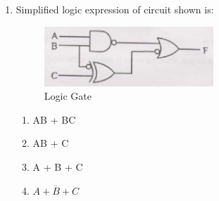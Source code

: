 \documentclass[journal,cmex10]{IEEEtran}
\theoremstyle{remark}
\numberwithin{equation}{enumi}
\numberwithin{figure}{enumi}
\begin{document}
\begin{enumerate}[label=\arabic*)]
    \item Simplified logic expression of circuit shown is:
    \begin{figure}[htbp]
  \centering
  \includegraphics[width=0.6\textwidth]{figs/C/fig11.png}
  \caption{Logic Gate}
  \label{C/fig11.png}
\end{figure}
    \bigskip 
    \hfill {}
    \begin{enumerate}[label=\alph*)]
        \item AB + BC
        \item AB + C
        \item A + B + C
        \item $\overline{A + B + C}$
    \end{enumerate}
    \bigskip


\end{enumerate}
\end{document}
